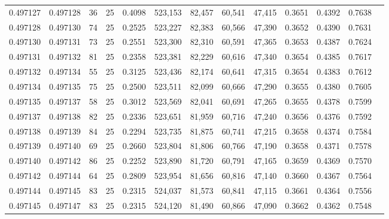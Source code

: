 \begin{tabular}{rrrrrrrrrrrrr}
0.497127 & 0.497128 &    36 &  25 &                                     0.4098 & 523,153 &  82,457 &  60,541 &  47,415 & 0.3651 & 0.4392 & 0.7638 \\
0.497128 & 0.497130 &    74 &  25 &                                     0.2525 & 523,227 &  82,383 &  60,566 &  47,390 & 0.3652 & 0.4390 & 0.7631 \\
0.497130 & 0.497131 &    73 &  25 &                                     0.2551 & 523,300 &  82,310 &  60,591 &  47,365 & 0.3653 & 0.4387 & 0.7624 \\
0.497131 & 0.497132 &    81 &  25 &                                     0.2358 & 523,381 &  82,229 &  60,616 &  47,340 & 0.3654 & 0.4385 & 0.7617 \\
0.497132 & 0.497134 &    55 &  25 &                                     0.3125 & 523,436 &  82,174 &  60,641 &  47,315 & 0.3654 & 0.4383 & 0.7612 \\
0.497134 & 0.497135 &    75 &  25 &                                     0.2500 & 523,511 &  82,099 &  60,666 &  47,290 & 0.3655 & 0.4380 & 0.7605 \\
0.497135 & 0.497137 &    58 &  25 &                                     0.3012 & 523,569 &  82,041 &  60,691 &  47,265 & 0.3655 & 0.4378 & 0.7599 \\
0.497137 & 0.497138 &    82 &  25 &                                     0.2336 & 523,651 &  81,959 &  60,716 &  47,240 & 0.3656 & 0.4376 & 0.7592 \\
0.497138 & 0.497139 &    84 &  25 &                                     0.2294 & 523,735 &  81,875 &  60,741 &  47,215 & 0.3658 & 0.4374 & 0.7584 \\
0.497139 & 0.497140 &    69 &  25 &                                     0.2660 & 523,804 &  81,806 &  60,766 &  47,190 & 0.3658 & 0.4371 & 0.7578 \\
0.497140 & 0.497142 &    86 &  25 &                                     0.2252 & 523,890 &  81,720 &  60,791 &  47,165 & 0.3659 & 0.4369 & 0.7570 \\
0.497142 & 0.497144 &    64 &  25 &                                     0.2809 & 523,954 &  81,656 &  60,816 &  47,140 & 0.3660 & 0.4367 & 0.7564 \\
0.497144 & 0.497145 &    83 &  25 &                                     0.2315 & 524,037 &  81,573 &  60,841 &  47,115 & 0.3661 & 0.4364 & 0.7556 \\
0.497145 & 0.497147 &    83 &  25 &                                     0.2315 & 524,120 &  81,490 &  60,866 &  47,090 & 0.3662 & 0.4362 & 0.7548 \\

\end{tabular}
